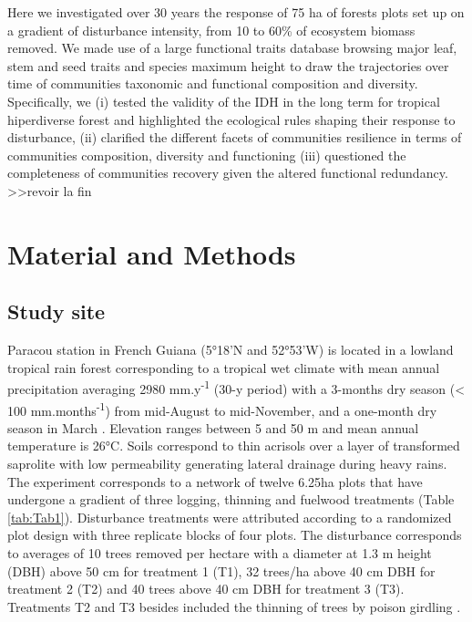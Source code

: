 \documentclass[fleqn,10pt]{ArtEcoFoG} %
\theoremstyle{definition}
\theoremstyle{definition}
\theoremstyle{definition}
\theoremstyle{remark}
\begin{document}
Here we investigated over 30 years the response of 75 ha of forests
plots set up on a gradient of disturbance intensity, from 10 to 60\% of
ecosystem biomass removed. We made use of a large functional traits
database browsing major leaf, stem and seed traits and species maximum
height to draw the trajectories over time of communities taxonomic and
functional composition and diversity. Specifically, we (i) tested the
validity of the IDH in the long term for tropical hiperdiverse forest
and highlighted the ecological rules shaping their response to
disturbance, (ii) clarified the different facets of communities
resilience in terms of communities composition, diversity and
functioning (iii) questioned the completeness of communities recovery
given the altered functional redundancy.
\textgreater{}\textgreater{}revoir la fin

\section{Material and Methods}\label{material-and-methods}

\subsection{Study site}\label{study-site}

Paracou station in French Guiana (5°18'N and 52°53'W) is located in a
lowland tropical rain forest corresponding to a tropical wet climate
with mean annual precipitation averaging 2980 mm.y\textsuperscript{-1}
(30-y period) with a 3-months dry season (\textless{} 100
mm.months\textsuperscript{-1}) from mid-August to mid-November, and a
one-month dry season in March \citep{Wagner2011}. Elevation ranges
between 5 and 50 m and mean annual temperature is 26°C. Soils correspond
to thin acrisols over a layer of transformed saprolite with low
permeability generating lateral drainage during heavy rains. The
experiment corresponds to a network of twelve 6.25ha plots that have
undergone a gradient of three logging, thinning and fuelwood treatments
(Table \ref{tab:Tab1}). Disturbance treatments were attributed according
to a randomized plot design with three replicate blocks of four plots.
The disturbance corresponds to averages of 10 trees removed per hectare
with a diameter at 1.3 m height (DBH) above 50 cm for treatment 1 (T1),
32 trees/ha above 40 cm DBH for treatment 2 (T2) and 40 trees above 40
cm DBH for treatment 3 (T3). Treatments T2 and T3 besides included the
thinning of trees by poison girdling \citep{Blanc2009}.
\end{document}
